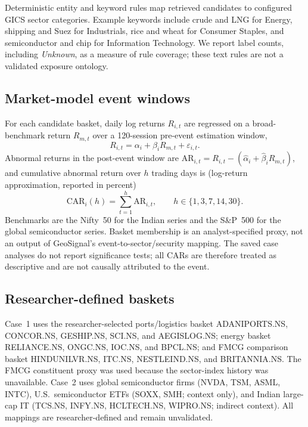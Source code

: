 \documentclass[10pt,a4paper,twocolumn]{article}
\newcommand{\CAR}{\mathrm{CAR}}
\begin{document}
Deterministic entity and keyword rules map retrieved candidates to configured GICS sector categories. Example keywords include crude and LNG for Energy, shipping and Suez for Industrials, rice and wheat for Consumer Staples, and semiconductor and chip for Information Technology. We report label counts, including \emph{Unknown}, as a measure of rule coverage; these text rules are not a validated exposure ontology.

\subsection{Market-model event windows}

For each candidate basket, daily log returns $R_{i,t}$ are regressed on a broad-benchmark return $R_{m,t}$ over a 120-session pre-event estimation window,
\begin{equation}
  R_{i,t} = \alpha_i + \beta_i R_{m,t} + \varepsilon_{i,t}.
\end{equation}
Abnormal returns in the post-event window are $\mathrm{AR}_{i,t} = R_{i,t} - (\hat\alpha_i + \hat\beta_i R_{m,t})$, and cumulative abnormal return over $h$ trading days is (log-return approximation, reported in percent)
\begin{equation}
  \CAR_i(h) = \sum_{t=1}^{h} \mathrm{AR}_{i,t}, \qquad h\in\{1,3,7,14,30\}.
\end{equation}
Benchmarks are the Nifty~50 for the Indian series and the S\&P~500 for the global semiconductor series. Basket membership is an analyst-specified proxy, not an output of GeoSignal's event-to-sector/security mapping. The saved case analyses do not report significance tests; all CARs are therefore treated as descriptive and are not causally attributed to the event.

\subsection{Researcher-defined baskets}

{\sloppy Case~1 uses the researcher-selected ports/logistics basket ADANIPORTS.NS, CONCOR.NS, GESHIP.NS, SCI.NS, and AEGISLOG.NS; energy basket RELIANCE.NS, ONGC.NS, IOC.NS, and BPCL.NS; and FMCG comparison basket HINDUNILVR.NS, ITC.NS, NESTLEIND.NS, and BRITANNIA.NS. The FMCG constituent proxy was used because the sector-index history was unavailable. Case~2 uses global semiconductor firms (NVDA, TSM, ASML, INTC), U.S.\ semiconductor ETFs (SOXX, SMH; context only), and Indian large-cap IT (TCS.NS, INFY.NS, HCLTECH.NS, WIPRO.NS; indirect context). All mappings are researcher-defined and remain unvalidated.}
\end{document}
